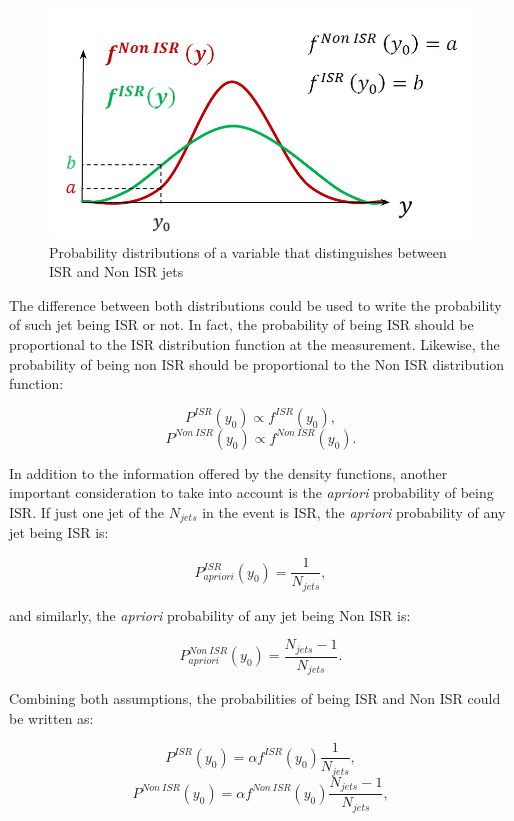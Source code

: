 \documentclass[12pt, oneside]{book}              %
\begin{document}
\begin{figure}[h]
	\centering
	\includegraphics[width=0.5\linewidth]{./Imags_Doc/Prob_ISR_Non}
	\caption[Probability distributions ISR - Non ISR]{Probability distributions of a variable that distinguishes between ISR and Non ISR jets}
	\label{fig:Prob_ISR_Non}
\end{figure}

The difference between both distributions could be used to write the probability of such jet being
ISR or not. In fact, the probability of being ISR should be proportional to the ISR distribution
function at the measurement. Likewise, the probability of being non ISR should be proportional to
the Non ISR distribution function:

\begin{equation} \label{eq:Prob_ISR_1}
P^{ISR}(y_0) \propto f^{ISR}(y_0),
\end{equation}
\begin{equation} \label{eq:Prob_Non_ISR_1}
P^{Non\ ISR}(y_0) \propto f^{Non\ ISR}(y_0).
\end{equation}

In addition to the information offered by the density functions, another important 
consideration to take into account is the \textit{apriori} probability of being ISR. If just one
jet of the $ N_{jets} $ in the event is ISR, the \textit{apriori} probability of any jet being ISR is:

\begin{equation} \label{eq:Prob_ISR_2}
P^{ISR}_{apriori}(y_0) = \frac{1}{N_{jets}},
\end{equation}

\noindent and similarly, the \textit{apriori} probability of any jet being Non ISR is:

\begin{equation} \label{eq:Prob_Non_ISR_2}
P^{Non\ ISR}_{apriori}(y_0) = \frac{N_{jets}-1}{N_{jets}}.
\end{equation}

Combining both assumptions, the probabilities of being ISR and Non ISR could be written as:

\begin{equation} \label{eq:Prob_ISR_3}
P^{ISR}(y_0) = \alpha f^{ISR}(y_0) \frac{1}{N_{jets}},
\end{equation}
\begin{equation} \label{eq:Prob_Non_ISR_3}
P^{Non\ ISR}(y_0) = \alpha f^{Non\ ISR}(y_0) \frac{N_{jets}-1}{N_{jets}},
\end{equation}
\end{document}
